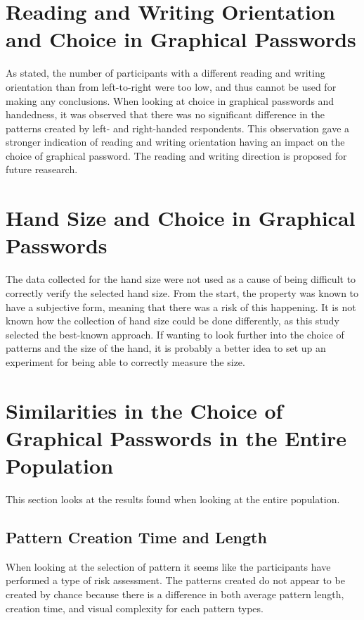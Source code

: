   \section{Reading and Writing Orientation and Choice in Graphical Passwords}
    As stated, the number of participants with a different reading and writing orientation than from left-to-right were too low, and thus cannot be used for making any conclusions. When looking at choice in graphical passwords and handedness, it was observed that there was no significant difference in the patterns created by left- and right-handed respondents. This observation gave a stronger indication of reading and writing orientation having an impact on the choice of graphical password. The reading and writing direction is proposed for future reasearch. 

  \section{Hand Size and Choice in Graphical Passwords}
    The data collected for the hand size were not used as a cause of being difficult to correctly verify the selected hand size. From the start, the property was known to have a subjective form, meaning that there was a risk of this happening. It is not known how the collection of hand size could be done differently, as this study selected the best-known approach. If wanting to look further into the choice of patterns and the size of the hand, it is probably a better idea to set up an experiment for being able to correctly measure the size. 

  \section{Similarities in the Choice of Graphical Passwords in the Entire Population}\label{sec:discussionEntirePopulation}

    This section looks at the results found when looking at the entire population. 

    \subsection{Pattern Creation Time and Length}

      When looking at the selection of pattern it seems like the participants have performed a type of risk assessment. The patterns created do not appear to be created by chance because there is a difference in both average pattern length, creation time, and visual complexity for each pattern types.

